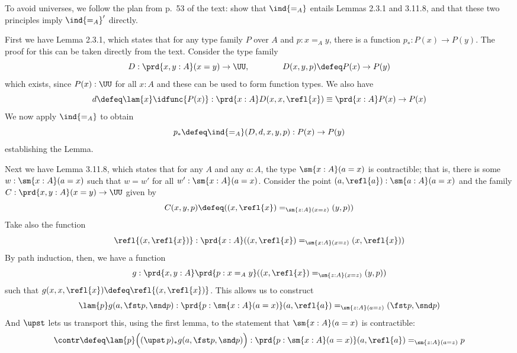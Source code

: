  \soln
To avoid universes, we follow the plan from p.~53 of the text: show that
$\ind{=_{A}}$ entails Lemmas 2.3.1 and 3.11.8, and that these two principles
imply $\ind{=_{A}}'$ directly.  


First we have Lemma 2.3.1, which states that for any type family $P$ over $A$
and $p : x =_{A} y$, there is a function $p_{*} : P(x) \to P(y)$.  The proof
for this can be taken directly from the text.  Consider the type family
\[
D : \prd{x, y : A}(x = y) \to \UU,
\qquad\qquad
D(x, y, p) \defeq P(x) \to P(y)
\]
which exists, since $P(x) : \UU$ for all $x : A$ and these can be used to form
function types.  We also have
\[
d \defeq \lam{x}\idfunc{P(x)} 
: \prd{x:A}D(x, x, \refl{x})
\equiv \prd{x:A} P(x) \to P(x)
\]
We now apply $\ind{=_{A}}$ to obtain
\[
p_{*} \defeq \ind{=_{A}}(D, d, x, y, p) : P(x) \to P(y)
\]
establishing the Lemma.


Next we have Lemma 3.11.8, which states that for any $A$ and any $a : A$, the
type $\sm{x:A} (a = x)$ is contractible;  that is, there is some $w :
\sm{x:A}(a=x)$ such that $w = w'$ for all $w' : \sm{x:A}(a=x)$.  Consider the
point $(a, \refl{a}) : \sm{a:A}(a=x)$ and the family $C: \prd{x,y:A}(x=y) \to \UU$ given
by
\[
  C(x, y, p) \defeq 
  ((x, \refl{x}) =_{\sm{z:A}(x=z)} (y, p))
\]
Take also the function
\[
  \refl{(x, \refl{x})} : \prd{x:A} ((x, \refl{x}) =_{\sm{x:A}(x=z)} (x, \refl{x}))
\]
By path induction, then, we have a function
\[
  g : \prd{x, y:A}\prd{p:x =_{A} y} 
  ((x, \refl{x}) =_{\sm{z:A}(x=z)} (y, p))
\]
such that $g(x, x, \refl{x}) \defeq \refl{(x, \refl{x})}$.  
This allows us to construct
\[
  \lam{p}g(a, \fst p, \snd p) : 
  \prd{p:\sm{x:A}(a=x)}
  (a, \refl{a}) =_{\sm{z:A}(a=z)} (\fst p, \snd p)
\]
And $\upst$ lets us transport this, using the first lemma, to the statement
that $\sm{x:A}(a=x)$ is contractible:
\[
\contr \defeq \lam{p}\Big(
(\upst\,p)_{*}g(a, \fst p, \snd p)
\Big)
:
\prd{p:\sm{x:A}(a=x)}
(a, \refl{a}) =_{\sm{z:A}(a=z)} p
\]



